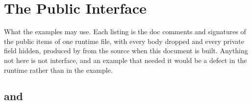 \section{The Public Interface}
\label{sec:x-interface}

What the examples may use. Each listing is the doc comments and
signatures of the public items of one runtime file, with every body
dropped and every private field hidden, produced by 
from the source when this document is built. Anything not here is not
interface, and an example that needed it would be a defect in the
runtime rather than in the example.

\subsection{}


\subsection{}


\subsection{ and }



\subsection{}

